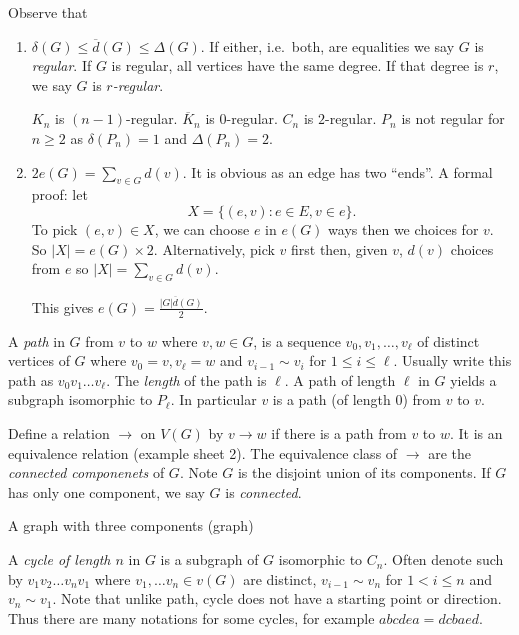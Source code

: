 \documentclass[a4paper]{article}
\begin{document}
Observe that
\begin{enumerate}
\item \(\delta(G) \leq \overline d(G) \leq \Delta(G)\). If either, i.e.\ both, are equalities we say \(G\) is \emph{regular}. If \(G\) is regular, all vertices have the same degree. If that degree is \(r\), we say \(G\) is \emph{\(r\)-regular}.
\begin{eg}
  \(K_n\) is \((n - 1)\)-regular. \(\overline K_n\) is \(0\)-regular. \(C_n\) is \(2\)-regular. \(P_n\) is not regular for \(n \geq 2\) as \(\delta(P_n) = 1\) and \(\Delta(P_n) = 2\).
\end{eg}
\item \(2 e(G) = \sum_{v \in G} d(v)\). It is obvious as an edge has two ``ends''. A formal proof: let
  \[
    X = \{(e, v): e \in E, v \in e\}.
  \]
  To pick \((e, v) \in X\), we can choose \(e\) in \(e(G)\) ways then we choices for \(v\). So \(|X| = e(G) \times 2\). Alternatively, pick \(v\) first then, given \(v\), \(d(v)\) choices from \(e\) so \(|X| = \sum_{v\in G} d(v)\).

  This gives \(e(G) = \frac{|G| \overline d(G)}{2}\).
\end{enumerate}

A \emph{path} in \(G\) from \(v\) to \(w\) where \(v, w \in G\), is a sequence \(v_0, v_1, \dots, v_\ell\) of distinct vertices of \(G\) where \(v_0 = v, v_\ell = w\) and \(v_{i - 1} \sim v_i\) for \(1 \leq i \leq \ell\). Usually write this path as \(v_0v_1\dots v_\ell\). The \emph{length} of the path is \(\ell\). A path of length \(\ell\) in \(G\) yields a subgraph isomorphic to \(P_\ell\). In particular \(v\) is a path (of length \(0\)) from \(v\) to \(v\).

Define a relation \(\to\) on \(V(G)\) by \(v \to w\) if there is a path from \(v\) to \(w\). It is an equivalence relation (example sheet 2). The equivalence class of \(\to\) are the \emph{connected componenets} of \(G\). Note \(G\) is the disjoint union of its components. If \(G\) has only one component, we say \(G\) is \emph{connected}.

\begin{eg}
  A graph with three components (graph)
\end{eg}

A \emph{cycle of length \(n\)} in \(G\) is a subgraph of \(G\) isomorphic to \(C_n\). Often denote such by \(v_1v_2\dots v_nv_1\) where \(v_1, \dots v_n \in v(G)\) are distinct, \(v_{i - 1} \sim v_n\) for \(1 < i \leq n\) and \(v_n \sim v_1\). Note that unlike path, cycle does not have a starting point or direction. Thus there are many notations for some cycles, for example \(abcdea = dcbaed\).
\end{document}
